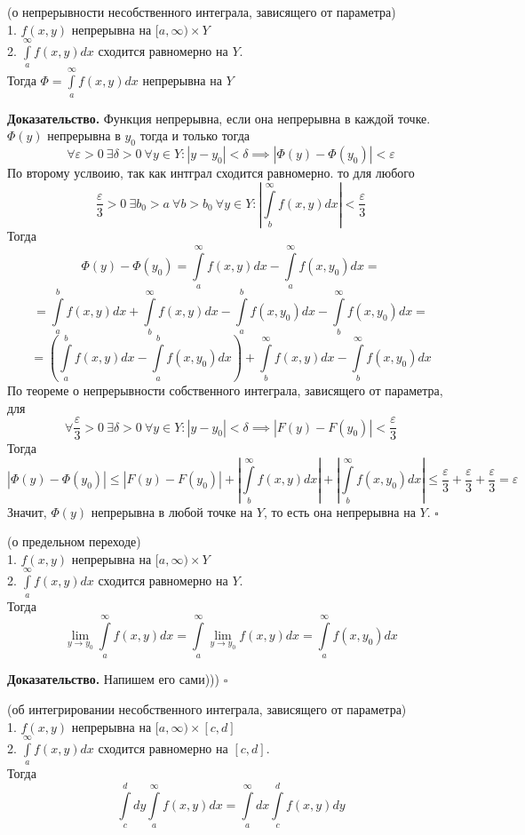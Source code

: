 \begin{theor}
    (о непрерывности несобственного интеграла, зависящего от параметра)\\
    1. $f(x,y)$ непрерывна на  $[a,\infty)\times Y$\\
    2. $\int\limits_{a}^{\infty} f(x,y)dx$ сходится равномерно на $Y$.\\
    Тогда  $\Phi=\int\limits_{a}^{\infty} f(x,y)dx$ непрерывна на $Y$
\end{theor}
\textbf{Доказательство.} 
Функция непрерывна, если она непрерывна в каждой точке. 
$\Phi(y)$ непрерывна в  $y_0$ тогда и только тогда
$$\forall \varepsilon>0~\exists \delta>0~\forall y\in Y:
|y-y_0|<\delta \implies |\Phi(y)-\Phi(y_0)|<\varepsilon$$
По второму услвоию, так как интграл сходится равномерно. то
для любого 
 $$\frac{\varepsilon}{3}>0~\exists b_0>a~\forall b>b_0~\forall y\in Y:
\left|\int\limits_{b}^{\infty} f(x,y)dx\right|<\frac{\varepsilon}{3}
 $$
Тогда 
$$
\Phi(y)-\Phi(y_0)=\int\limits_{a}^{\infty} f(x,y)dx-
\int\limits_{a}^{\infty} f(x,y_0)dx=
$$
$$
=\int\limits_{a}^{b} f(x,y)dx+ \int\limits_{b}^{\infty}f(x,y)dx -
\int\limits_{a}^{b} f(x,y_0)dx -\int\limits_{b}^{\infty}f(x,y_0)dx=
$$
$$
=\left( \int\limits_{a}^{b} f(x,y)dx-\int\limits_{a}^{b} f(x,y_0)dx\right) +
\int\limits_{b}^{\infty}f(x,y)dx-\int\limits_{b}^{\infty}f(x,y_0)dx
$$
По теореме о непрерывности собственного интеграла, зависящего от параметра, 
для
$$
\forall \frac{\varepsilon}{3}>0~\exists \delta>0~\forall y\in Y:
|y-y_0|<\delta \implies |F(y)-F(y_0)|<\frac{\varepsilon}{3}
$$
Тогда 
$$|\Phi(y)-\Phi(y_0)|\leqslant |F(y)-F(y_0)|+ 
\left|\int\limits_{b}^{\infty}f(x,y)dx  \right| + 
\left|\int\limits_{b}^{\infty}f(x,y_0)dx \right|\leqslant 
\frac{\varepsilon}{3}+\frac{\varepsilon}{3}+\frac{\varepsilon}{3}=
\varepsilon$$
Значит, $\Phi(y)$ непрерывна в любой точке на $Y$, то есть она непрерывна
на $Y$. $\square$ 
\begin{theor}
    (о предельном переходе)\\
    1. $f(x,y)$ непрерывна на  $[a,\infty)\times Y$\\
    2. $\int\limits_{a}^{\infty} f(x,y)dx$ сходится равномерно на $Y$.\\
    Тогда  
$$\lim\limits_{y \to y_0}\int\limits_{a}^{\infty} f(x,y)dx=
\int\limits_{a}^{\infty} \lim\limits_{y \to y_0}f(x,y)dx = 
\int\limits_{a}^{\infty}f(x,y_0)dx$$
\end{theor}
\textbf{Доказательство.}  Напишем его сами)))
$\square$ 
\begin{theor}
    (об интегрировании несобственного интеграла, зависящего от параметра)\\
    1. $f(x,y)$ непрерывна на  $[a,\infty)\times [c,d]$\\
    2. $\int\limits_{a}^{\infty} f(x,y)dx$ сходится равномерно на $[c,d]$.\\
    Тогда 
    $$\int\limits_{c}^{d}dy \int\limits_{a}^{\infty}f(x,y)dx =
    \int\limits_{a}^{\infty}dx \int\limits_{c}^{d}f(x,y)dy$$
\end{theor}
